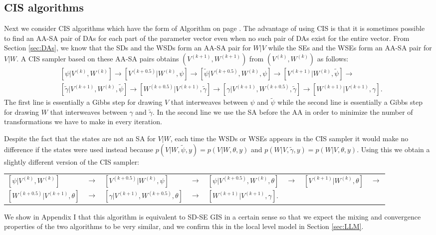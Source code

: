 \documentclass[12pt]{article}
\begin{document}
\subsection{CIS algorithms}\label{sec:Algs:CIS}
Next we consider CIS algorithms which have the form of Algorithm  on page \pageref{alg:CIS}. The advantage of using CIS is that it is sometimes possible to find an AA-SA pair of DAs for each part of the parameter vector even when no such pair of DAs exist for the entire vector. From Section \ref{sec:DAs}, we know that the SDs and the WSDs form an AA-SA pair for $W|V$ while the SEs and the WSEs form an AA-SA pair for $V|W$.  A CIS sampler based on these AA-SA pairs obtains $(V^{(k+1)},W^{(k+1)})$ from $(V^{(k)},W^{(k)})$ as follows:
\begin{align*}
&[\psi|V^{(k)},W^{(k)}] \to [V^{(k+0.5)}|W^{(k)},\psi] \to [\tilde{\psi}|V^{(k+0.5)},W^{(k)},\psi] \to [V^{(k+1)}|W^{(k)},\tilde{\psi}]\to\\
&[\tilde{\gamma}|V^{(k+1)},W^{(k)},\tilde{\psi}] \to [W^{(k+0.5)}|V^{(k+1)},\tilde{\gamma}] \to [\gamma|V^{(k+1)},W^{(k+0.5)},\tilde{\gamma}]\to [W^{(k+1)}|V^{(k+1)},\gamma].
\end{align*}
The first line is essentially a Gibbs step for drawing $V$ that interweaves between $\psi$ and $\tilde{\psi}$ while the second line is essentially a Gibbs step for drawing $W$ that interweaves between $\gamma$ and $\tilde{\gamma}$. In the second line we use the SA before the AA in order to minimize the number of transformations we have to make in every iteration. 

Despite the fact that the states are not an SA for $V|W$, each time the WSDs or WSEs appears in the CIS sampler it would make no difference if the states were used instead because $p(V|W,\tilde{\psi},y)=p(V|W,\theta,y)$ and $p(W|V,\tilde{\gamma},y)=p(W|V,\theta,y)$. Using this we obtain a slightly different version of the CIS sampler: \vspace{-.1cm}
{\small
\begin{center}
\begin{tabular}{llllllll}
$[\psi|V^{(k)},W^{(k)}]$ & $\to$ & $[V^{(k+0.5)}|W^{(k)},\psi]$ & $\to$ & $[\psi|V^{(k+0.5)},W^{(k)},\theta]$ & $\to$ & $[V^{(k+1)}|W^{(k)},\theta]$ & $\to$ \\
$[W^{(k+0.5)}|V^{(k+1)},\theta]$ & $\to$ & $[\gamma|V^{(k+1)},W^{(k+0.5)},\theta]$ & $\to$ & $[W^{(k+1)}|V^{(k+1)},\gamma]$.&&&
\end{tabular}
\end{center}
}
\noindent We show in Appendix I that this algorithm is equivalent to SD-SE GIS in a certain sense so that we expect the mixing and convergence properties of the two algorithms to be very similar, and we confirm this in the local level model in Section \ref{sec:LLM}.
\end{document}
